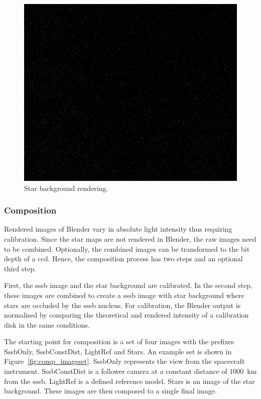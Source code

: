 \begin{figure}[htb]
    \centering
    \includegraphics[width=\textwidth]{doc/thesis/0_figures/star_rendering/Stars_2017-08-15T115856-171000.png}
    \caption{Star background rendering.}
    \label{fig:star_rendering}
\end{figure}

\subsubsection{Composition} \label{sec:composition}
Rendered images of Blender vary in absolute light intensity thus requiring calibration. Since the star maps are not rendered in Blender, the raw images need to be combined. Optionally, the combined images can be transformed to the bit depth of a \gls{ccd}. Hence, the composition process has two steps and an optional third step. 

First, the \gls{sssb} image and the star background are calibrated. In the second step, these images are combined to create a \gls{sssb} image with star background where stars are occluded by the \gls{sssb} nucleus. For calibration, the Blender output is normalised by comparing the theoretical and rendered intensity of a calibration disk in the same conditions.

The starting point for composition is a set of four images with the prefixes SssbOnly, SssbConstDist, LightRef and Stars. An example set is shown in Figure~\ref{fig:comp_imageset}. SssbOnly represents the view from the spacecraft instrument. SssbConstDist is a follower camera at a constant distance of \SI{1000}{\kilo\meter} from the \gls{sssb}. LightRef is a defined reference model. Stars is an image of the star background. These images are then composed to a single final image.

